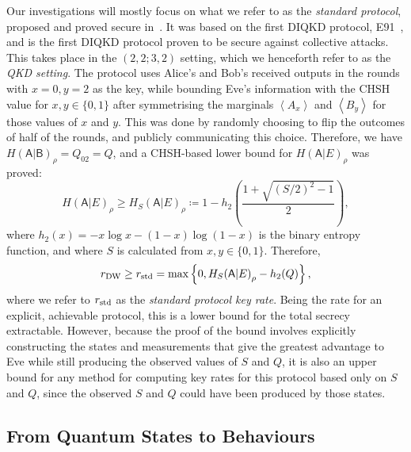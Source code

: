 \documentclass[10pt, a4paper]{article}
\numberwithin{equation}{section} %
\theoremstyle{definition}
\theoremstyle{plain}
\newcommand{\?}{\mathrel{?}} %
\newcommand{\angleb}[1]{\left\langle #1 \right\rangle} %
\newcommand{\crv}[1]{\mathsf{#1}}
\newcommand{\DW}{\rm DW}
\newcommand{\std}{\rm std}
\begin{document}
    Our investigations will mostly focus on what we refer to as the \emph{standard protocol}, proposed and proved secure in~\cite{DIQKD_Lower}. It was based on the first DIQKD protocol, E91~\cite{E91}, and is the first DIQKD protocol proven to be secure against collective attacks. This takes place in the \((2,2;3,2)\) setting, which we henceforth refer to as the \emph{QKD setting}. The protocol uses Alice's and Bob's received outputs in the rounds with \(x = 0, y = 2\) as the key, while bounding Eve's information with the CHSH value for \(x,y \in \{0,1\}\) after symmetrising the marginals \(\angleb{A_x}\) and \(\angleb{B_y}\) for those values of \(x\) and \(y\). This was done by randomly choosing to flip the outcomes of half of the rounds, and publicly communicating this choice. Therefore, we have \({H(\crv{A}|\crv{B})}_{\rho} = Q_{02} = Q\), and a CHSH-based lower bound for \({H(\crv{A}|E)}_{\rho}\) was proved:
    \begin{equation}
      {H(\crv{A}|E)}_{\rho} \geq {H_S(\crv{A}|E)}_{\rho} \coloneqq 1 - h_2\left( \frac{1 + \sqrt{{(S/2)}^2-1}}{2} \right),
    \end{equation}
    where \(h_2(x) = - x \log x - (1-x) \log (1-x)\) is the binary entropy function, and where \(S\) is calculated from \(x,y \in \{0,1\}\). Therefore,
    \begin{equation}
      r_{\DW} \geq r_{\std} = \max \left\{ 0, {H_S(\crv{A}|E)}_{\rho} - h_2(Q) \right\},
    \end{equation}
    where we refer to \(r_{\std}\) as the \emph{standard protocol key rate}. Being the rate for an explicit, achievable protocol, this is a lower bound for the total secrecy extractable. However, because the proof of the bound involves explicitly constructing the states and measurements that give the greatest advantage to Eve while still producing the observed values of \(S\) and \(Q\), it is also an upper bound for any method for computing key rates for this protocol based only on \(S\) and \(Q\), since the observed \(S\) and \(Q\) could have been produced by those states.

    \subsection{From Quantum States to Behaviours}\label{sec:diqkd_behavstate}
\end{document}
